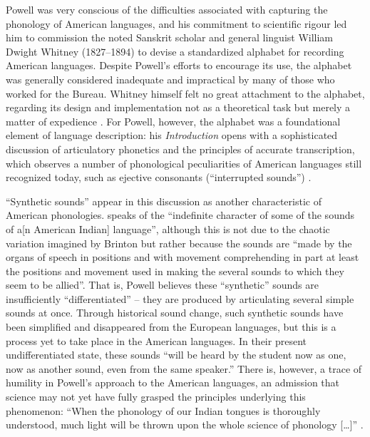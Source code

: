 \documentclass[output=paper]{langscibook}
\begin{document}
Powell was very conscious of the difficulties associated with capturing the phonology of American languages, and his commitment to scientific rigour led him to commission the noted Sanskrit scholar and general linguist William Dwight Whitney (1827–1894) to devise a standardized alphabet for recording American languages. Despite Powell's efforts to encourage its use, the alphabet was generally considered inadequate and impractical by many of those who worked for the Bureau. Whitney himself felt no great attachment to the alphabet, regarding its design and implementation not as a theoretical task but merely a matter of expedience \citep[see][50-51]{Darnell1998}. For Powell, however, the alphabet was a foundational element of language description: his \emph{Introduction} opens with a sophisticated discussion of articulatory phonetics and the principles of accurate transcription, which observes a number of phonological peculiarities of American languages still recognized today, such as ejective consonants (``interrupted sounds'') \citep[1-16]{Powell18801877}.

``Synthetic sounds'' appear in this discussion as another characteristic of American phonologies. \citet[12]{Powell18801877} speaks of the ``indefinite character of some of the sounds of a[n American Indian] language'', although this is not due to the chaotic variation imagined by Brinton but rather because the sounds are ``made by the organs of speech in positions and with movement comprehending in part at least the positions and movement used in making the several sounds to which they seem to be allied''. That is, Powell believes these ``synthetic'' sounds are insufficiently ``differentiated'' – they are produced by articulating several simple sounds at once. Through historical sound change, such synthetic sounds have been simplified and disappeared from the European languages, but this is a process yet to take place in the American languages. In their present undifferentiated state, these sounds ``will be heard by the student now as one, now as another sound, even from the same speaker.'' There is, however, a trace of humility in Powell's approach to the American languages, an admission that science may not yet have fully grasped the principles underlying this phenomenon: ``When the phonology of our Indian tongues is thoroughly understood, much light will be thrown upon the whole science of phonology […]'' \citep[13]{Powell18801877}.
\end{document}
